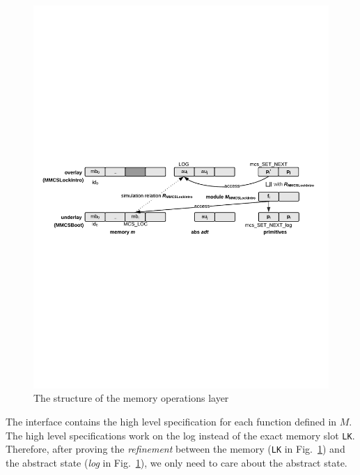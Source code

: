\begin{figure}
\begin{center}
\includegraphics[width=\linewidth]{figs/mcslock/layer3}
\end{center}
\caption{The structure of the memory operations layer}
\label{fig:layer-struct-mcs-verification}
\end{figure}

The interface  contains the high level specification for each function defined in $M$. 
The high level specifications work on the log instead of the exact memory slot \lstinline$LK$.
Therefore, after proving the {\em refinement} between the memory (\lstinline$LK$ in Fig.~\ref{fig:layer-struct-mcs-verification})
and the abstract state (\emph{log} in Fig.~\ref{fig:layer-struct-mcs-verification}), we only need to care about the abstract state.

